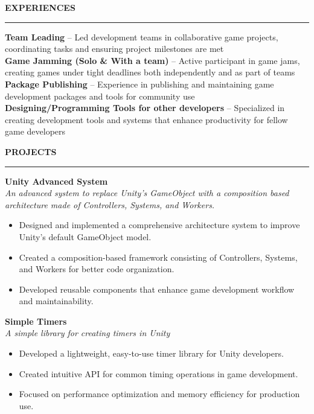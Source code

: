\documentclass[a4paper,10pt]{article}
\newcommand{\sectionheading}[1]{%
  \addvspace{\medskipamount}%
  {\large\bfseries\MakeUppercase{#1}} %
  \noindent\rule{\linewidth}{0.4pt}%
  \vspace{\smallskipamount}%
}
\begin{document}
\sectionheading{Experiences}

\textbf{Team Leading} -- Led development teams in collaborative game projects, coordinating tasks and ensuring project milestones are met \\
\textbf{Game Jamming (Solo \& With a team)} -- Active participant in game jams, creating games under tight deadlines both independently and as part of teams \\
\textbf{Package Publishing} -- Experience in publishing and maintaining game development packages and tools for community use \\
\textbf{Designing/Programming Tools for other developers} -- Specialized in creating development tools and systems that enhance productivity for fellow game developers

\sectionheading{Projects}

\textbf{Unity Advanced System} \\
\textit{An advanced system to replace Unity's GameObject with a composition based architecture made of Controllers, Systems, and Workers.}
\begin{itemize}[nosep]
    \item Designed and implemented a comprehensive architecture system to improve Unity's default GameObject model.
    \item Created a composition-based framework consisting of Controllers, Systems, and Workers for better code organization.
    \item Developed reusable components that enhance game development workflow and maintainability.
\end{itemize}

\addvspace{\medskipamount} %

\textbf{Simple Timers} \\
\textit{A simple library for creating timers in Unity}
\begin{itemize}[nosep]
    \item Developed a lightweight, easy-to-use timer library for Unity developers.
    \item Created intuitive API for common timing operations in game development.
    \item Focused on performance optimization and memory efficiency for production use.
\end{itemize}
\end{document}
